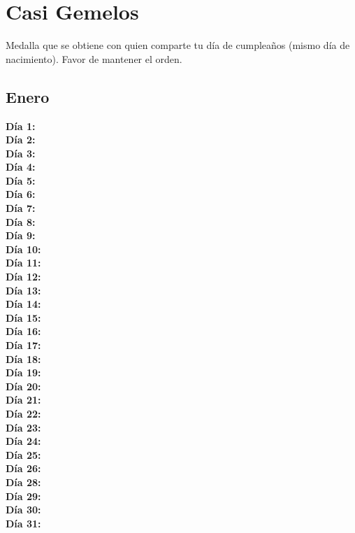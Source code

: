 \section{Casi Gemelos}
Medalla que se obtiene con quien comparte tu día de cumpleaños (mismo día de nacimiento). Favor de mantener el orden.

\subsection{Enero}
\textbf{Día 1:} \\
\textbf{Día 2:} \\
\textbf{Día 3:} \\
\textbf{Día 4:} \\
\textbf{Día 5:} \\
\textbf{Día 6:} \\
\textbf{Día 7:} \\
\textbf{Día 8:} \\
\textbf{Día 9:} \\
\textbf{Día 10:} \\
\textbf{Día 11:} \\
\textbf{Día 12:} \\
\textbf{Día 13:} \\
\textbf{Día 14:} \\
\textbf{Día 15:} \\
\textbf{Día 16:} \\
\textbf{Día 17:} \\
\textbf{Día 18:} \\
\textbf{Día 19:} \\
\textbf{Día 20:} \\
\textbf{Día 21:} \\
\textbf{Día 22:} \\
\textbf{Día 23:} \\
\textbf{Día 24:} \\
\textbf{Día 25:} \\
\textbf{Día 26:} \\
\textbf{Día 28:} \\
\textbf{Día 29:} \\
\textbf{Día 30:} \\
\textbf{Día 31:} \\

